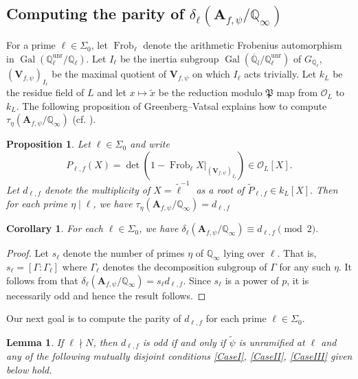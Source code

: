 \documentclass{amsart}
\newcommand{\Q}{\mathbb{Q}}
\newcommand{\bV}{\mathbf{V}}
\newcommand{\bA}{\mathbf{A}}
\newcommand{\Gal}{\operatorname{Gal}}
\newcommand{\Frob}{\operatorname{Frob}}
\newtheorem{auxiliary proposition}[theorem]{Auxiliary Proposition}
\newtheorem{corollary}[theorem]{Corollary}
\newtheorem{lemma}[theorem]{Lemma}
\newtheorem{main conjecture}[theorem]{Main Conjecture}
\newtheorem{main theorem}[theorem]{Main Theorem}
\newtheorem{modesty proposition}[theorem]{Modesty Proposition}
\newtheorem{open problem}[theorem]{Open Problem}
\newtheorem{proposition}[theorem]{Proposition}
\newtheorem{convergence lemma}[theorem]{Convergence Lemma}
\newtheorem{corrected lemma}[theorem]{Corrected Lemma}
\newtheorem{growth lemma}[theorem]{Growth Lemma}
\newtheorem{coefficient lemma}[theorem]{Integrality Lemma}
\newtheorem{interpolation lemma}[theorem]{Interpolation Lemma}
\newtheorem{kernel lemma}[theorem]{Kernel Lemma}
\newtheorem{limit lemma}[theorem]{Limit Lemma}
\newtheorem{tandem lemma}[theorem]{Modesty Lemma}
\newtheorem{zero-finding lemma}[theorem]{Zero-Finding Lemma}
\begin{document}
\subsection{Computing the parity of $\delta_\ell(\bA_{f,\psi}/\Q_\infty)$} For a prime $\ell \in \Sigma_0$, let $\Frob_\ell$ denote the arithmetic Frobenius automorphism in $\Gal(\Q_\ell^{\mathrm{unr}}/\Q_\ell)$. Let $I_\ell$ be the inertia subgroup $ \Gal(\overline{\Q}_l/\Q_\ell^{\mathrm{unr}})$ of $G_{\Q_\ell}$, $(\bV_{f , \psi})_{I_\ell}$ be the maximal quotient of $\bV_{f , \psi}$ on which $I_\ell$ acts trivially. Let $k_L$ be the residue field of $L$ and let $x \mapsto \tilde{x}$ be the reduction modulo $\mathfrak{P}$ map from $\mathcal{O}_L$ to $k_L$. The following proposition of Greenberg--Vatsal explains how to compute $\tau_{\eta}(\bA_{f,\psi}/\Q_\infty)$ (cf. \cite[Proposition 2.4]{GreenbergVatsal}).
\begin{proposition}
 Let $\ell \in \Sigma_0$ and write 
 $$P_{\ell,f}(X)=\det(1-\Frob_{\ell}X|_{(\bV_{f , \psi})_{I_\ell}}) \in \mathcal{O}_L[X].$$
 Let $d_{\ell,f}$ denote the multiplicity of $X=\tilde{\ell}^{-1}$ as a root of $\tilde{P}_{\ell,f} \in k_L[X].$ Then for each prime $\eta \mid \ell$, we have $\tau_{\eta}(\bA_{f,\psi}/\Q_\infty)=d_{\ell,f}$
\end{proposition}
\begin{corollary}
    For each $\ell \in \Sigma_0$, we have $\delta_\ell(\bA_{f,\psi}/\Q_\infty)\equiv d_{\ell,f} \pmod 2.$
\end{corollary}
\begin{proof}
    Let $s_\ell$ denote the number of primes $\eta$ of $\Q_\infty$ lying over $\ell$. That is, $s_\ell=[\Gamma:\Gamma_\ell]$ where $\Gamma_\ell$ denotes the decomposition subgroup of $\Gamma$ for any such $\eta$. It follows from \cite[page 37 and Proposition 2.4]{GreenbergVatsal} that $\delta_\ell(\bA_{f,\psi}/\Q_\infty)=s_\ell d_{\ell,f}$. Since $s_\ell$ is a power of $p$, it is necessarily odd and hence the result follows.
\end{proof}
Our next goal is to compute the parity of $d_{\ell,f}$ for each prime $\ell \in \Sigma_0$.
\begin{lemma}\label{lem:noN}
    If $ \ell \nmid N$, then $d_{\ell,f}$ is odd if and only if $\tilde{\psi}$ is unramified at $\ell$ and any of the following mutually disjoint conditions \eqref{CaseI}, \eqref{CaseII}, \eqref{CaseIII} given below  hold. 
\end{lemma}
\end{document}
